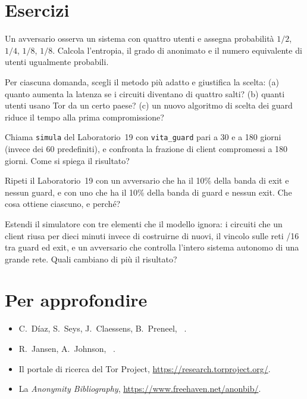 \section*{Esercizi}

\begin{esercizio}[1]\label{es:29-entropia}
Un avversario osserva un sistema con quattro utenti e assegna probabilità $1/2$, $1/4$, $1/8$, $1/8$. Calcola l'entropia, il grado di anonimato e il numero equivalente di utenti ugualmente probabili.
\end{esercizio}

\begin{esercizio}[1]\label{es:29-metodo}
Per ciascuna domanda, scegli il metodo più adatto e giustifica la scelta: (a) quanto aumenta la latenza se i circuiti diventano di quattro salti? (b) quanti utenti usano Tor da un certo paese? (c) un nuovo algoritmo di scelta dei guard riduce il tempo alla prima compromissione?
\end{esercizio}

\begin{esercizio}[2]\label{es:29-durata}
Chiama \texttt{simula} del Laboratorio~19 con \texttt{vita\_guard} pari a 30 e a 180 giorni (invece dei 60 predefiniti), e confronta la frazione di client compromessi a 180 giorni. Come si spiega il risultato?
\end{esercizio}

\begin{esercizio}[2]\label{es:29-asimmetria}
Ripeti il Laboratorio~19 con un avversario che ha il 10\% della banda di exit e nessun guard, e con uno che ha il 10\% della banda di guard e nessun exit. Che cosa ottiene ciascuno, e perché?
\end{esercizio}

\begin{esercizio}[3]\label{es:29-torps}
Estendi il simulatore con tre elementi che il modello ignora: i circuiti che un client riusa per dieci minuti invece di costruirne di nuovi, il vincolo sulle reti /16 tra guard ed exit, e un avversario che controlla l'intero sistema autonomo di una grande rete. Quali cambiano di più il risultato?
\end{esercizio}

\section*{Per approfondire}
\begin{itemize}
  \item C.~Díaz, S.~Seys, J.~Claessens, B.~Preneel, ~\cite{diaz2002measuring}.
  \item R.~Jansen, A.~Johnson, ~\cite{jansen2016privcount}.
  \item Il portale di ricerca del Tor Project, \url{https://research.torproject.org/}.
  \item La \emph{Anonymity Bibliography}, \url{https://www.freehaven.net/anonbib/}.
\end{itemize}
